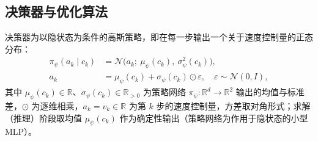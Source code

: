 \subsection{决策器与优化算法}
决策器为以隐状态为条件的高斯策略，即在每一步输出一个关于速度控制量的正态分布：
\begin{equation}
\begin{aligned}
\pi_{\psi}(a_k\mid c_k)&=\mathcal{N}\big(a_k;\ \mu_{\psi}(c_k),\ \sigma_{\psi}^{2}(c_k)\big),\\
a_k&=\mu_{\psi}(c_k)+\sigma_{\psi}(c_k)\odot\varepsilon,\quad \varepsilon\sim\mathcal{N}(0,I),
\end{aligned}
\end{equation}
其中 $\mu_{\psi}(c_k)\in\mathbb{R}$、$\sigma_{\psi}(c_k)\in\mathbb{R}_{>0}$ 为策略网络 $\pi_{\psi}:\mathbb{R}^{d}\to\mathbb{R}^{2}$ 输出的均值与标准差，$\odot$ 为逐维相乘，$a_k=v_k\in\mathbb{R}$ 为第 $k$ 步的速度控制量，方差取对角形式；求解（推理）阶段取均值 $\mu_{\psi}(c_k)$ 作为确定性输出（策略网络为作用于隐状态的小型 MLP）。

